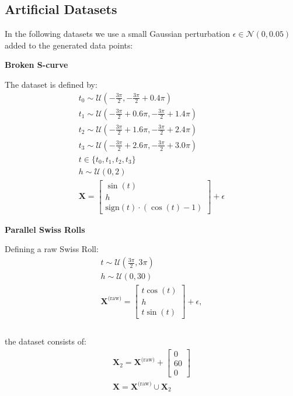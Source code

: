 \documentclass{article} %
\begin{document}
\subsection{Artificial Datasets}

In the following datasets we use a small Gaussian perturbation $\epsilon\in\mathcal{N}(0,0.05)$ added to the generated data points:



\textbf{Broken S-curve}

The dataset is defined by: 
\begin{align}
t_0 \sim \mathcal{U}\left(-\frac{3\pi}{2}, -\frac{3\pi}{2} + 0.4\pi\right) \\
t_1 \sim \mathcal{U}\left(-\frac{3\pi}{2} + 0.6\pi, -\frac{3\pi}{2} + 1.4\pi\right) \\
t_2 \sim \mathcal{U}\left(-\frac{3\pi}{2} + 1.6\pi, -\frac{3\pi}{2} + 2.4\pi\right) \\
t_3 \sim \mathcal{U}\left(-\frac{3\pi}{2} + 2.6\pi, -\frac{3\pi}{2} + 3.0\pi\right) \\
t \in \{t_0, t_1, t_2, t_3\} \\
h \sim \mathcal{U}(0, 2) \\
\mathbf{X} = \begin{bmatrix}
\sin(t) \\
h \\
\text{sign}(t) \cdot (\cos(t) - 1)
\end{bmatrix} + \epsilon
\end{align}

\textbf{Parallel Swiss Rolls}

Defining a raw Swiss Roll:
\begin{align}
t \sim \mathcal{U}\left(\frac{3\pi}{2}, 3\pi\right) \\
 h \sim \mathcal{U}(0, 30) \\
 \mathbf{X}^{\text{(raw)}} = \begin{bmatrix}
t \cos(t) \\
h \\
t \sin(t)
\end{bmatrix} + \epsilon, \\
\\
\end{align}

the dataset consists of:
\begin{align}
    \mathbf{X}_2 = \mathbf{X}^{\text{(raw)}} + \begin{bmatrix} 0 \\ 60 \\ 0 \end{bmatrix} \\
    \mathbf{X} = \mathbf{X}^{\text{(raw)}} \cup \mathbf{X}_2
\end{align}
\end{document}
